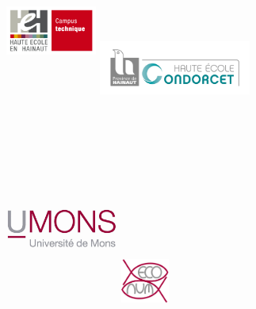 \documentclass[]{report}
\title{}
\author{}
\date{}
\begin{document}

\begin{centering}

\begin{figure}

\includegraphics[width=3.0cm, height=6cm]{../image/technique-logo.jpg} 
\includegraphics[width=5.0cm, height=3.5cm]{../image/condorcet.jpg}
\includegraphics[width=3.7cm, height=7cm]{../image/UMONS-logo.jpg}
\includegraphics[width=1.6cm, height=3.5cm]{../image/ECONUM-logo.pdf}

\end{figure}


\end{centering}
\end{document}
